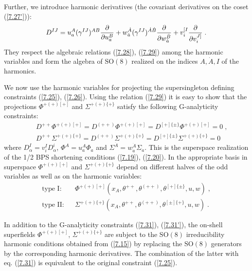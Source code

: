 \documentclass[a4paper,12pt]{article}
\begin{document}
Further, we introduce harmonic derivatives (the covariant 
derivatives on the coset (\ref{7.27'})): 
\begin{equation}\label{7.30}
  D^{IJ} = u^A_a (\gamma^{IJ})^{AB}{\partial\over\partial u^B_a} + 
w^{\dot A}_{\dot a} (\gamma^{IJ})^{\dot A\dot 
B}{\partial\over\partial w^{\dot B}_{\dot a}} + v^{[I}_i 
{\partial\over\partial v^{J]}_{i}}\;. 
\end{equation}
They respect the algebraic relations  (\ref{7.28}), (\ref{7.29}) 
among the harmonic variables and form the algebra of 
$\mbox{SO}(8)$ realized on the indices $A,\dot A, I$ of the 
harmonics. 

We now use the harmonic variables for projecting the 
supersingleton defining constraints (\ref{7.25}), (\ref{7.26}). 
Using the relation (\ref{7.29}) it is easy to show that the 
projections $\Phi^{+(+)[+]}$ and $\Sigma^{+(+)\{+\}}$ satisfy the 
following G-analyticity constraints: 
\begin{eqnarray}
  &&D^{++}\Phi^{+(+)[+]} = D^{(++)}\Phi^{+(+)[+]}=D^{[+]\{\pm\}} 
\Phi^{+(+)[+]} = 0\;, \label{7.31}\\ 
  &&D^{++}\Sigma^{+(+)\{+\}} = D^{(++)}\Sigma^{+(+)\{+\}}=D^{[+]\{\pm\}} 
\Sigma^{+(+)\{+\}} = 0 \label{7.31'} 
\end{eqnarray}
where $D^I_\alpha = v^I_iD^i_\alpha$, $\Phi^A = u^A_a\Phi_a$ and 
$\Sigma^{\dot A} = w^{\dot A}_{\dot a}\Sigma_{\dot a}$. This is 
the superspace realization of the 1/2 BPS shortening conditions 
(\ref{7.19}), (\ref{7.20}). In the appropriate basis in superspace 
$\Phi^{+(+)[+]}$ and $\Sigma^{+(+)\{+\}}$ depend on different 
halves of the odd variables as well as on the harmonic variables:
\begin{eqnarray}
  \mbox{type I}:&& \Phi^{+(+)[+]}
(x_A,\theta^{++}, \theta^{(++)}, \theta^{[+]\{\pm\}}, u,w) \;, 
\label{7.32}\\ 
 \mbox{type II}: && \Sigma^{+(+)\{+\}}(x_A,\theta^{++},\theta^{(++)},
\theta^{[\pm]\{+\}}, u,w)\;.\label{7.32'} 
\end{eqnarray}


In addition to the G-analyticity constraints (\ref{7.31}), 
(\ref{7.31'}), the on-shell superfields $\Phi^{+(+)[+]}$, 
$\Sigma^{+(+)\{+\}}$ are subject to the $\mbox{SO}(8)$ 
irreducibility harmonic conditions obtained from (\ref{7.15}) by 
replacing the $\mbox{SO}(8)$ generators by the corresponding 
harmonic derivatives. The combination of the latter with eq. 
(\ref{7.31}) is equivalent to the original constraint 
(\ref{7.25}). 
\end{document}
